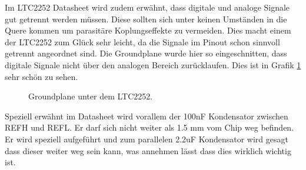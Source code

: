 Im LTC2252 Datasheet wird zudem erwähnt, dass digitale und analoge Signale gut getrennt werden müssen. Diese sollten sich unter keinen Umständen in die Quere kommen um parasitäre Koplungseffekte zu vermeiden. Dies macht einem der LTC2252 zum Glück sehr leicht, da die Signale im Pinout schon sinnvoll getrennt angeordnet sind.
Die Groundplane wurde hier so eingeschnitten, dass digitale Signale nicht über den analogen Bereich zurücklaufen. Dies ist in Grafik \ref{fig:groundplane_bsp} sehr schön zu sehen.

\begin{figure}[ht]
\begin{center}
    \caption{Groundplane unter dem LTC2252.}
    \label{fig:groundplane_bsp}
\end{center}
\end{figure}

Speziell erwähnt im Datasheet wird vorallem der 100nF Kondensator zwischen REFH und REFL. Er darf sich nicht weiter als 1.5 mm vom Chip weg befinden. Er wird speziell aufgeführt und zum parallelen 2.2uF Kondensator wird gesagt dass dieser weiter weg sein kann, was annehmen lässt dass dies wirklich wichtig ist.